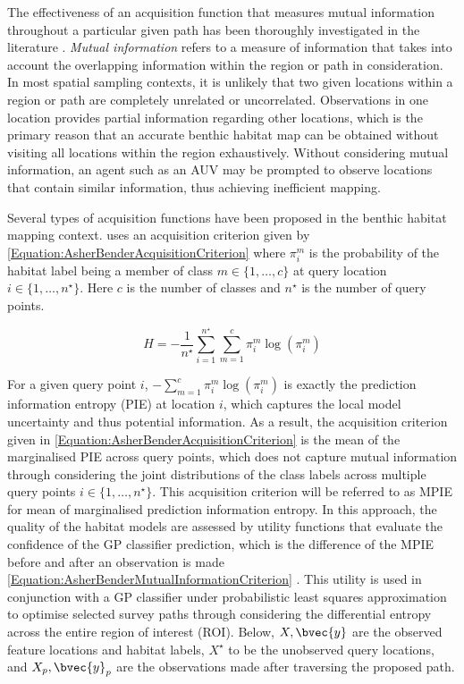 			The effectiveness of an acquisition function that measures mutual information throughout a particular given path has been thoroughly investigated in the literature \citep{AsherBender, Rigby:ROB20372, Krause:2008:NSP:1390681.1390689, Kapoor}. \textit{Mutual information} refers to a measure of information that takes into account the overlapping information within the region or path in consideration. In most spatial sampling contexts, it is unlikely that two given locations within a region or path are completely unrelated or uncorrelated. Observations in one location provides partial information regarding other locations, which is the primary reason that an accurate benthic habitat map can be obtained without visiting all locations within the region exhaustively. Without considering mutual information, an agent such as an AUV may be prompted to observe locations that contain similar information, thus achieving inefficient mapping.
			
			Several types of acquisition functions have been proposed in the benthic habitat mapping context. \cite{AsherBender} uses an acquisition criterion given by \eqref{Equation:AsherBenderAcquisitionCriterion} where $\pi^{m}_{i}$ is the probability of the habitat label being a member of class $m \in \{1, \dots, c\}$ at query location $i \in \{1, \dots, n^{\star}\}$. Here $c$ is the number of classes and $n^{\star}$ is the number of query points.
			
			\begin{equation}
				H = - \frac{1}{n^{\star}} \sum_{i = 1}^{n^{\star}} \sum_{m = 1}^{c} \pi^{m}_{i} \log(\pi^{m}_{i})
			\label{Equation:AsherBenderAcquisitionCriterion}
			\end{equation}
			
			For a given query point $i$, $- \sum_{m = 1}^{c} \pi^{m}_{i} \log(\pi^{m}_{i})$ is exactly the prediction information entropy (PIE) at location $i$, which captures the local model uncertainty and thus potential information. As a result, the acquisition criterion given in \eqref{Equation:AsherBenderAcquisitionCriterion} is the mean of the marginalised PIE across query points, which does not capture mutual information through considering the joint distributions of the class labels across multiple query points $i \in \{1, \dots, n^{\star}\}$. This acquisition criterion will be referred to as MPIE for mean of marginalised prediction information entropy. In this approach, the quality of the habitat models are assessed by utility functions that evaluate the confidence of the GP classifier prediction, which is the difference of the MPIE before and after an observation is made \eqref{Equation:AsherBenderMutualInformationCriterion} \citep{Rigby:ROB20372}. This utility is used in conjunction with a GP classifier under probabilistic least squares approximation to optimise selected survey paths through considering the differential entropy across the entire region of interest (ROI). Below, $X, \bvec{y}$ are the observed feature locations and habitat labels, $X^{\star}$ to be the unobserved query locations, and $X_{p}, \bvec{y}_{p}$ are the observations made after traversing the proposed path.
		
